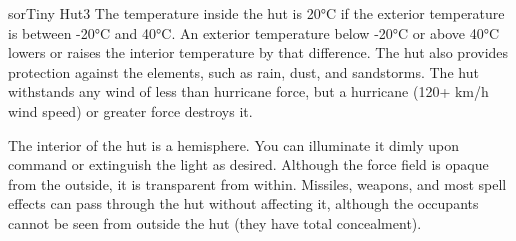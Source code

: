 \begin{spellcard}{sor}{Tiny Hut}{3}
  The temperature inside the hut is 20°C if the exterior temperature is between -20°C and 40°C.
  An exterior temperature below -20°C or above 40°C lowers or raises the interior temperature by that difference.
  The hut also provides protection against the elements, such as rain, dust, and sandstorms.
  The hut withstands any wind of less than hurricane force,
  but a hurricane (120+ km/h wind speed) or greater force destroys it.

  The interior of the hut is a hemisphere.
  You can illuminate it dimly upon command or extinguish the light as desired.
  Although the force field is opaque from the outside, it is transparent from within.
  Missiles, weapons, and most spell effects can pass through the hut without affecting it,
  although the occupants cannot be seen from outside the hut (they have total concealment).
\end{spellcard}

